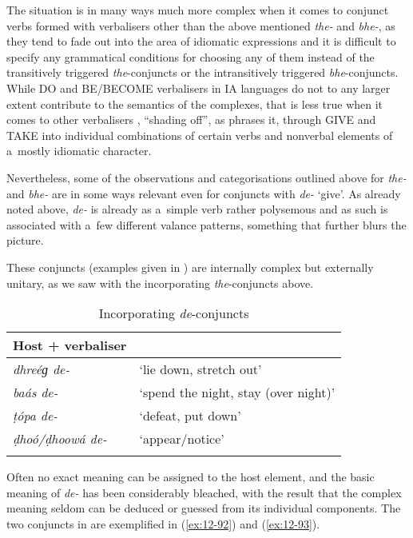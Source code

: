 The situation is in many ways much more complex when it comes to conjunct verbs formed with
verbalisers other than the above mentioned \textit{the-} and \textit{bhe-}, as they tend to fade out
into the area of idiomatic expressions and it is difficult to specify any grammatical conditions for
choosing any of them instead of the transitively triggered \textit{the}-conjuncts or the
intransitively triggered \textit{bhe}-conjuncts. While DO and BE/BECOME verbalisers in IA
languages do not to any larger extent contribute to the semantics of the complexes, that is less
true when it comes to other verbalisers \citep[78--79]{gambhir1993}, ``shading off'', as
\citet[157]{masica1993} phrases it, through GIVE and TAKE into individual combinations of certain
verbs and nonverbal elements of a~mostly idiomatic character.



Nevertheless, some of the observations and categorisations outlined above for \textit{the-} and \textit{bhe-} are in some ways relevant even for conjuncts with \textit{de-} `give'. As already noted above, \textit{de-} is already as a~simple verb rather polysemous and as such is associated with a~few different valance patterns, something that further blurs the picture.


 These conjuncts (examples given in ) are internally complex but externally unitary, as we saw with the incorporating \textit{the}-conjuncts above. 


\begin{table}[ht]
\caption{Incorporating \textit{de}-conjuncts}
\begin{tabularx}{.75\textwidth}{ l@{\hspace{45pt}} Q }
\lsptoprule
Host + verbaliser &
\\\hline
\textit{dhreéɡ de-} &
`lie down, stretch out'\\
\textit{baás de-} &
`spend the night, stay (over night)'\\
\textit{ṭópa de-} &
`defeat, put down'\\
\textit{ḍhoó/ḍhoowá de-} &
`appear/notice'\\\lspbottomrule
\end{tabularx}
\label{tab:12-7}
\end{table}


Often no exact meaning can be assigned to the host element, and the basic meaning of \textit{de-} has been considerably bleached, with the result that the complex meaning seldom can be deduced or guessed from its individual components. The two conjuncts in  are exemplified in (\ref{ex:12-92}) and (\ref{ex:12-93}).

